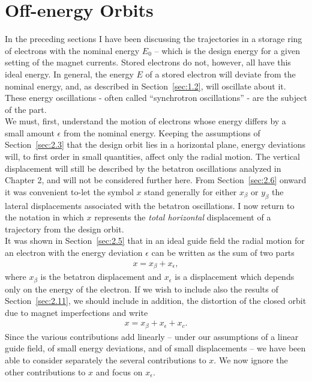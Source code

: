 \section{Off-energy Orbits}\label{sec:3.1}

In the preceding sections I have been discussing the trajectories in a storage ring of electrons with the nominal energy $E_0$ -- which is the design energy for a given setting of the magnet currents. Stored electrons do not, however, all have this ideal energy. In general, the energy $E$ of a stored electron will deviate from the nominal energy, and, as described in Section~\ref{sec:1.2}, will oscillate about it. These energy oscillations - often called “synchrotron oscillations” - are the subject of the part.\\
We must, first, understand the motion of electrons whose energy differs by a small amount $\epsilon$ from the nominal energy. Keeping the assumptions of Section~\ref{sec:2.3} that the design orbit lies in a horizontal plane, energy deviations will, to first order in small quantities, affect only the radial motion. The vertical displacement will still be described by the betatron oscillations analyzed in Chapter 2, and will not be considered further here. From Section~\ref{sec:2.6} onward it was convenient to-let the symbol $x$ stand generally for either $x_\beta$ or $y_\beta$ the lateral displacements associated with the betatron oscillations. I now return to the notation in which $x$ represents the \emph{total horizontal} displacement of a trajectory from the design orbit.\\
It was shown in Section~\ref{sec:2.5} that in an ideal guide field the radial motion for
an electron with the energy deviation $\epsilon$ can be written as the sum of two parts
\begin{align}
	x = x_\beta+x_\epsilon,
\end{align}
where $x_\beta$ is the betatron displacement and $x_\epsilon$ is a displacement which depends
only on the energy of the electron. If we wish to include also the results of Section~\ref{sec:2.11}, we should include in addition, the distortion of the closed orbit due to magnet imperfections and write
\begin{align}
	x = x_\beta+x_\epsilon+x_c.
\end{align}
Since the various contributions add linearly -- under our assumptions of a linear guide field, of
 small energy deviations, and of small displacements -- we have been able to consider separately
 the several contributions to $x$. We now ignore the other contributions to $x$ and focus on $x_\epsilon$.
